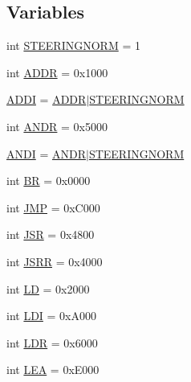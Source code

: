 \subsection*{Variables}
\begin{DoxyCompactItemize}
\item 
int \hyperlink{namespace_qt_l_c3_1_1_l_c3_helper_ac1252434698120b0fe5f93491268215f}{S\-T\-E\-E\-R\-I\-N\-G\-N\-O\-R\-M} = 1
\item 
int \hyperlink{namespace_qt_l_c3_1_1_l_c3_helper_a2755d6265d2b3b158525ab68e253bc53}{A\-D\-D\-R} = 0x1000
\item 
\hyperlink{namespace_qt_l_c3_1_1_l_c3_helper_a870d6aff07b57f130171b8de8762429f}{A\-D\-D\-I} = \hyperlink{namespace_qt_l_c3_1_1_l_c3_helper_a2755d6265d2b3b158525ab68e253bc53}{A\-D\-D\-R}$\vert$\hyperlink{namespace_qt_l_c3_1_1_l_c3_helper_ac1252434698120b0fe5f93491268215f}{S\-T\-E\-E\-R\-I\-N\-G\-N\-O\-R\-M}
\item 
int \hyperlink{namespace_qt_l_c3_1_1_l_c3_helper_a708c0a74889a4ebe74b3b4aca5a689f0}{A\-N\-D\-R} = 0x5000
\item 
\hyperlink{namespace_qt_l_c3_1_1_l_c3_helper_a74183f176a3d37fb085953d31270977b}{A\-N\-D\-I} = \hyperlink{namespace_qt_l_c3_1_1_l_c3_helper_a708c0a74889a4ebe74b3b4aca5a689f0}{A\-N\-D\-R}$\vert$\hyperlink{namespace_qt_l_c3_1_1_l_c3_helper_ac1252434698120b0fe5f93491268215f}{S\-T\-E\-E\-R\-I\-N\-G\-N\-O\-R\-M}
\item 
int \hyperlink{namespace_qt_l_c3_1_1_l_c3_helper_a149ab214faca1440f8e8af5aaabbf655}{B\-R} = 0x0000
\item 
int \hyperlink{namespace_qt_l_c3_1_1_l_c3_helper_a9cfcb139adf16a156aa0e870bfc85a7d}{J\-M\-P} = 0x\-C000
\item 
int \hyperlink{namespace_qt_l_c3_1_1_l_c3_helper_a152d613276c3ea907e432835077675e4}{J\-S\-R} = 0x4800
\item 
int \hyperlink{namespace_qt_l_c3_1_1_l_c3_helper_abf6d27ff681f7adc316c548fd3c3ef01}{J\-S\-R\-R} = 0x4000
\item 
int \hyperlink{namespace_qt_l_c3_1_1_l_c3_helper_a967020a01ae6b98a4730fe11bf09b508}{L\-D} = 0x2000
\item 
int \hyperlink{namespace_qt_l_c3_1_1_l_c3_helper_a102fef9d0708f7b9d1f6af3a541ed5fa}{L\-D\-I} = 0x\-A000
\item 
int \hyperlink{namespace_qt_l_c3_1_1_l_c3_helper_a671ecbeb3d540e5d11929c18d3ff37f7}{L\-D\-R} = 0x6000
\item 
int \hyperlink{namespace_qt_l_c3_1_1_l_c3_helper_a6582e54ef243974ac33d19bdef271a30}{L\-E\-A} = 0x\-E000

\end{DoxyCompactItemize}
